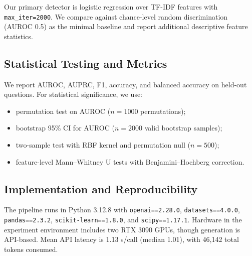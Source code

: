 Our primary detector is logistic regression over TF-IDF features with \texttt{max\_iter=2000}. We compare against chance-level random discrimination (AUROC 0.5) as the minimal baseline and report additional descriptive feature statistics.

\subsection{Statistical Testing and Metrics}
We report AUROC, AUPRC, F1, accuracy, and balanced accuracy on held-out questions. For statistical significance, we use:
\begin{itemize}[leftmargin=*,itemsep=0pt,topsep=0pt]
    \item permutation test on AUROC ($n=1000$ permutations);
    \item bootstrap 95\% CI for AUROC ($n=2000$ valid bootstrap samples);
    \item \mmd two-sample test with RBF kernel and permutation null ($n=500$);
    \item feature-level Mann--Whitney U tests with Benjamini--Hochberg correction.
\end{itemize}

\subsection{Implementation and Reproducibility}
The pipeline runs in Python 3.12.8 with \texttt{openai==2.28.0}, \texttt{datasets==4.0.0}, \texttt{pandas==2.3.2}, \texttt{scikit-learn==1.8.0}, and \texttt{scipy==1.17.1}. Hardware in the experiment environment includes two RTX 3090 GPUs, though generation is API-based. Mean API latency is 1.13 s/call (median 1.01), with 46,142 total tokens consumed.
